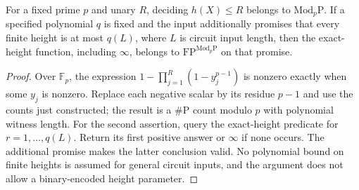 \begin{corollary}\label{cor:unary-threshold}
For a fixed prime $p$ and unary $R$, deciding $h(X)\le R$ belongs
to $\mathrm{Mod}_p\mathrm P$. If a specified polynomial $q$ is
fixed and the input additionally promises that every finite height
is at most $q(L)$, where $L$ is circuit input length, then the
exact-height function, including $\infty$, belongs to
$\mathrm{FP}^{\mathrm{Mod}_p\mathrm P}$ on that promise.
\end{corollary}
\begin{proof}
Over $\mathbb F_p$, the expression
$1-\prod_{j=1}^R(1-y_j^{p-1})$ is nonzero exactly when some
$y_j$ is nonzero. Replace each negative scalar by its residue
$p-1$ and use the counts just constructed; the result is a
$\#\mathrm P$ count modulo $p$ with polynomial witness length.
For the second assertion, query the exact-height predicate for
$r=1,\ldots,q(L)$. Return its first positive answer or $\infty$
if none occurs. The additional promise makes the latter conclusion
valid. No polynomial bound on finite heights is assumed for
general circuit inputs, and the argument does not allow a
binary-encoded height parameter.
\end{proof}

